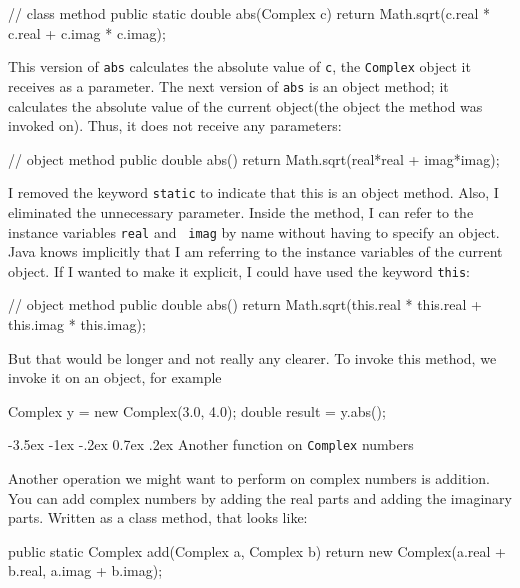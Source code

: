 \documentclass{book}
\makeatletter
\renewcommand{\section}{\@startsection 
    {section} {1} {0mm}%
    {-3.5ex \@plus -1ex \@minus -.2ex}%
    {0.7ex \@plus.2ex}%
    {\normalfont\Large\bfseries}}
\makeatother
\begin{document}
\begin{verbatimtab}
// class method
public static double abs(Complex c) {
    return Math.sqrt(c.real * c.real + c.imag * c.imag);
} 
\end{verbatimtab}
%
This version of {\tt abs} calculates the absolute value of {\tt c},
the {\tt Complex} object it receives as a parameter.  The next version
of {\tt abs} is an object method; it calculates the absolute value of
the current object(the object the method was invoked on).  Thus,
it does not receive any parameters:

\begin{verbatimtab}
// object method
public double abs() {
    return Math.sqrt(real*real + imag*imag);
}
\end{verbatimtab}
%
I removed the keyword {\tt static} to indicate that this is an object
method.  Also, I eliminated the unnecessary parameter.  Inside the
method, I can refer to the instance variables {\tt real} and {\tt
imag} by name without having to specify an object.  Java knows
implicitly that I am referring to the instance variables of the
current object.  If I wanted to make it explicit, I could have used
the keyword {\tt this}:

\begin{verbatimtab}
// object method
public double abs() {
    return Math.sqrt(this.real * this.real + this.imag * this.imag);
}
\end{verbatimtab}

But that would be longer and not really any clearer.  To invoke
this method, we invoke it on an object, for example

\begin{verbatimtab}
    Complex y = new Complex(3.0, 4.0);
    double result = y.abs();
\end{verbatimtab}


\section{Another function on {\tt Complex} numbers}

Another operation we might want to perform on complex numbers
is addition.  You can add complex numbers by adding the real
parts and adding the imaginary parts.  Written as a class method,
that looks like:

\begin{verbatimtab}
public static Complex add(Complex a, Complex b) {
    return new Complex(a.real + b.real, a.imag + b.imag);
}
\end{verbatimtab}
\end{document}
